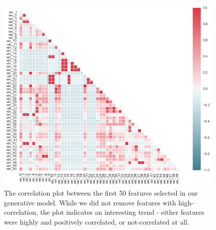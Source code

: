 \documentclass[letterpaper]{article}
\begin{document}
\begin{figure}
\includegraphics[scale=0.4]{covariance}
\caption{The correlation plot between the first 50 features selected in our generative model. While we did not remove features with high-correlation, the plot indicates an interesting trend - either features were highly and positively correlated, or not-correlated at all.}
\label{fig:correlation_plot}
\end{figure}
\end{document}
